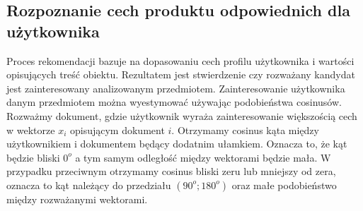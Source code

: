 \documentclass[12pt,a4paper]{report}
\begin{document}
\subsection{Rozpoznanie cech produktu odpowiednich dla użytkownika} 
Proces rekomendacji bazuje na dopasowaniu cech profilu użytkownika i wartości opisujących treść obiektu. Rezultatem jest stwierdzenie czy rozważany kandydat jest zainteresowany analizowanym przedmiotem. Zainteresowanie użytkownika danym przedmiotem można wyestymować używając podobieństwa cosinusów. Rozważmy dokument, gdzie użytkownik wyraża zainteresowanie większością cech w wektorze $x_i$ opisującym dokument $i$. Otrzymamy cosinus kąta między użytkownikiem i dokumentem będący dodatnim ułamkiem. Oznacza to, że kąt będzie bliski $0^{o}$ a tym samym odległość między wektorami będzie mała. W przypadku przeciwnym otrzymamy cosinus bliski zeru lub mniejszy od zera, oznacza to kąt należący do przedziału $(90^{o};180^{o})$ oraz małe podobieństwo między rozważanymi wektorami.
\end{document}
